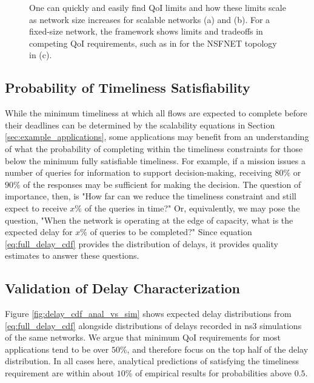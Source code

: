 \begin{figure}[]
{        \label{fig:use_case_nsf}
        }
   \vspace{-1mm}
   \caption{One can quickly and easily find QoI limits and how these limits scale as network size increases for scalable networks (a) and (b). For a fixed-size network, the framework shows limits and tradeoffs in competing QoI requirements, such as in for the NSFNET topology in (c). }
   \label{fig:huh_net_design}
   \vspace{-6mm}
\end{figure}

\subsection{Probability of Timeliness Satisfiability}

While the minimum timeliness at which all flows are expected to complete before their deadlines can be determined by the scalability equations in Section \ref{sec:example_applications}, some applications may benefit from an understanding of what the probability of completing within the timeliness constraints for those below the minimum fully satisfiable timeliness.  For example, if a mission issues a number of queries for information to support decision-making, receiving $80\%$ or $90\%$ of the responses may be sufficient for making the decision.  The question of importance, then, is "How far can we reduce the timeliness constraint and still expect to receive $x\%$ of the queries in time?"  Or, equivalently, we may pose the question, "When the network is operating at the edge of capacity, what is the expected delay for $x\%$ of queries to be completed?"  Since equation \ref{eq:full_delay_cdf} provides the distribution of delays, it provides quality estimates to answer these questions.  

\subsection{Validation of Delay Characterization}

Figure \ref{fig:delay_cdf_anal_vs_sim} shows expected delay distributions from \ref{eq:full_delay_cdf} alongside distributions of delays recorded in ns3 simulations of the same networks.  We argue that minimum QoI requirements for most applications tend to be over $50\%$, and therefore focus on the top half of the delay distribution.  In all cases here, analytical predictions of satisfying the timeliness requirement are within about $10\%$ of empirical results for probabilities above $0.5$.  

